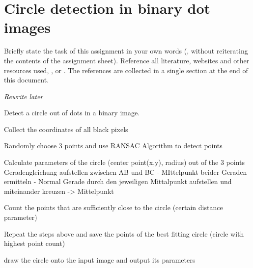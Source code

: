 \chapter{Circle detection in binary dot images}

Briefly state the task of this assignment in your own words (\ie, without reiterating the
contents of the assignment sheet). Reference all literature, websites and other resources used,
\eg, \cite{Higham1998,Guttman2001} or \cite{Mermin1989}. 
The references are collected in a single section at the end of this document.

{\it Rewrite later}

Detect a circle out of dots in a binary image. 

Collect the coordinates of all black pixels

Randomly choose 3 points and use RANSAC Algorithm to detect points

Calculate parameters of the circle (center point(x,y), radius) out of the 3 points
Geradengleichung aufstellen zwischen AB und BC - MIttelpunkt beider Geraden ermitteln - Normal Gerade durch den jeweiligen Mittalpunkt aufstellen und miteinander kreuzen -> Mittelpunkt 

Count the points that are sufficiently close to the circle (certain distance parameter)

Repeat the steps above and save the points of the best fitting circle (circle with highest point count)

draw the circle onto the input image and output its parameters